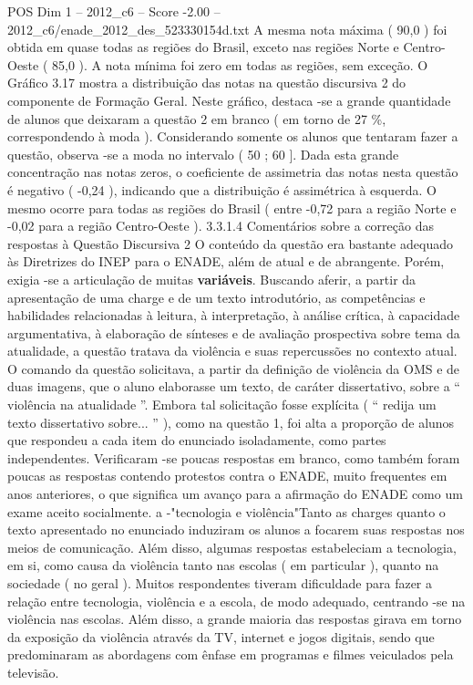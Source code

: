 \begin{textsample}{POS Dim 1 – 2012\_c6 – Score -2.00 – 2012\_c6/enade\_2012\_des\_523330154d.txt}
A mesma nota máxima ( 90,0 ) foi obtida em quase todas as regiões do Brasil, exceto nas regiões Norte e Centro-Oeste ( 85,0 ).
A nota mínima foi zero em todas as regiões, sem exceção.
O Gráfico 3.17 mostra a distribuição das notas na questão discursiva 2 do componente de Formação Geral.
Neste gráfico, destaca -se a grande quantidade de alunos que deixaram a questão 2 em branco ( em torno de 27 \%, correspondendo à moda ).
Considerando somente os alunos que tentaram fazer a questão, observa -se a moda no intervalo ( 50 ; 60 ].
Dada esta grande concentração nas notas zeros, o coeficiente de assimetria das notas nesta questão é negativo ( -0,24 ), indicando que a distribuição é assimétrica à esquerda.
O mesmo ocorre para todas as regiões do Brasil ( entre -0,72 para a região Norte e -0,02 para a região Centro-Oeste ). 3.3.1.4 Comentários sobre a correção das respostas à Questão Discursiva 2 O conteúdo da questão era bastante adequado às Diretrizes do INEP para o ENADE, além de atual e de abrangente.
Porém, exigia -se a articulação de muitas \textbf{variáveis}.
Buscando aferir, a partir da apresentação de uma charge e de um texto introdutório, as competências e habilidades relacionadas à leitura, à interpretação, à análise crítica, à capacidade argumentativa, à elaboração de sínteses e de avaliação prospectiva sobre tema da atualidade, a questão tratava da violência e suas repercussões no contexto atual.
O comando da questão solicitava, a partir da definição de violência da OMS e de duas imagens, que o aluno elaborasse um texto, de caráter dissertativo, sobre a “ violência na atualidade ”.
Embora tal solicitação fosse explícita ( “ redija um texto dissertativo sobre... ” ), como na questão 1, foi alta a proporção de alunos que respondeu a cada item do enunciado isoladamente, como partes independentes.
Verificaram -se poucas respostas em branco, como também foram poucas as respostas contendo protestos contra o ENADE, muito frequentes em anos anteriores, o que significa um avanço para a afirmação do ENADE como um exame aceito socialmente. a -"tecnologia e violência"Tanto as charges quanto o texto apresentado no enunciado induziram os alunos a focarem suas respostas nos meios de comunicação.
Além disso, algumas respostas estabeleciam a tecnologia, em si, como causa da violência tanto nas escolas ( em particular ), quanto na sociedade ( no geral ).
Muitos respondentes tiveram dificuldade para fazer a relação entre tecnologia, violência e a escola, de modo adequado, centrando -se na violência nas escolas.
Além disso, a grande maioria das respostas girava em torno da exposição da violência através da TV, internet e jogos digitais, sendo que predominaram as abordagens com ênfase em programas e filmes veiculados pela televisão.

\end{textsample}
